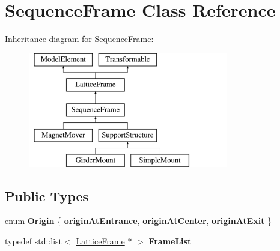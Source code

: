 \hypertarget{classSequenceFrame}{}\section{Sequence\+Frame Class Reference}
\label{classSequenceFrame}
Inheritance diagram for Sequence\+Frame\+:\begin{figure}[H]
\begin{center}
\leavevmode
\includegraphics[height=5.000000cm]{classSequenceFrame}
\end{center}
\end{figure}
\subsection*{Public Types}
\begin{DoxyCompactItemize}
\item 
\mbox{\label{classSequenceFrame_ad13ef567a4c33639db2ebeaf6e9dad41}} 
enum {\bfseries Origin} \{ {\bfseries origin\+At\+Entrance}, 
{\bfseries origin\+At\+Center}, 
{\bfseries origin\+At\+Exit}
 \}
\item 
\mbox{\label{classSequenceFrame_aff4f66e9d5b58fb192a1bcb3beb9edf6}} 
typedef std\+::list$<$ \hyperlink{classLatticeFrame}{Lattice\+Frame} $\ast$ $>$ {\bfseries Frame\+List}
\end{DoxyCompactItemize}
